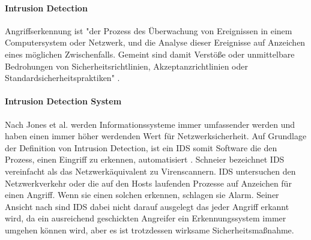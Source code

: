 \paragraph{Intrusion Detection}
Angriffserkennung ist "der Prozess des Überwachung von Ereignissen in einem Computersystem oder Netzwerk, und die Analyse dieser Ereignisse auf Anzeichen eines möglichen Zwischenfalls. Gemeint sind damit Verstöße oder unmittelbare Bedrohungen von Sicherheitsrichtlinien, Akzeptanzrichtlinien oder Standardsicherheitspraktiken" \cite{scarfone2007guide}. 

\paragraph{Intrusion Detection System}
Nach Jones et al. \cite{jones_computer_nodate} werden Informationssysteme immer umfassender werden und haben einen immer höher werdenden Wert für Netzwerksicherheit. 
Auf Grundlage der Definition von Intrusion Detection, ist ein IDS somit Software die den Prozess, einen Eingriff zu erkennen, automatisiert \cite{scarfone2007guide}.
Schneier \cite{schneier_managed_2001} bezeichnet IDS vereinfacht als das Netzwerkäquivalent zu Virenscannern. IDS untersuchen den Netzwerkverkehr oder die auf den Hosts laufenden Prozesse auf Anzeichen für einen Angriff. Wenn sie einen solchen erkennen, schlagen sie Alarm. Seiner Ansicht nach sind IDS  dabei nicht darauf ausgelegt das jeder Angriff erkannt wird, da ein ausreichend geschickten Angreifer ein Erkennungssystem immer umgehen können wird, aber es ist trotzdessen wirksame Sicherheitsmaßnahme.

